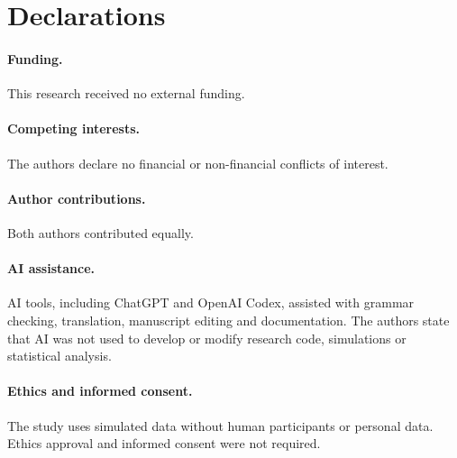 \section*{Declarations}
\paragraph{Funding.} This research received no external funding.

\paragraph{Competing interests.} The authors declare no financial or non-financial conflicts of interest.

\paragraph{Author contributions.} Both authors contributed equally.

\paragraph{AI assistance.} AI tools, including ChatGPT and OpenAI Codex, assisted with grammar checking, translation, manuscript editing and documentation. The authors state that AI was not used to develop or modify research code, simulations or statistical analysis.

\paragraph{Ethics and informed consent.} The study uses simulated data without human participants or personal data. Ethics approval and informed consent were not required.
